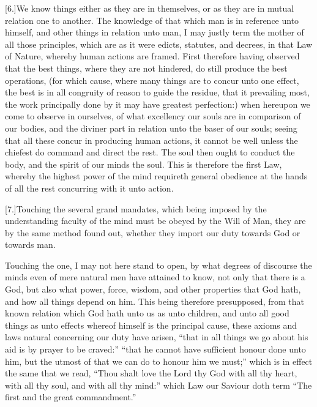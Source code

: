 [6.]We know things either as they are in themselves, or as they are in mutual relation one to another. The knowledge of that which man is in reference unto himself, and other things in relation unto man, I may justly term the mother of all those principles, which are as it were edicts, statutes, and decrees, in that Law of Nature, whereby human actions are framed. First therefore having observed that the best things, where they are not hindered, do still produce the best operations, (for which cause, where many things are to concur unto one effect, the best is in all congruity of reason to guide the residue, that it prevailing most, the work principally done by it may have greatest perfection:) when hereupon we come to observe in ourselves, of what excellency our souls are in comparison of our bodies, and the diviner part in relation unto the baser of our souls; seeing that all these concur in producing human actions, it cannot be well unless the chiefest do command and direct the rest. The soul then ought to conduct the body, and the spirit of our minds the soul. This is therefore the first Law, whereby the highest power of the mind requireth general obedience at the hands of all the rest concurring with it unto action.

[7.]Touching the several grand mandates, which being imposed by the understanding faculty of the mind must be obeyed by the Will of Man, they are by the same method found out, whether they import our duty towards God or towards man.

Touching the one, I may not here stand to open, by what degrees of discourse the minds even of mere natural men have attained to know, not only that there is a God, but also what power, force, wisdom, and other properties that God hath, and how all things depend on him. This being therefore presupposed, from that known relation which God hath  unto us as unto children, and unto all good things as unto effects whereof himself is the principal cause, these axioms and laws natural concerning our duty have arisen, “that in all things we go about his aid is by prayer to be craved:” “that he cannot have sufficient honour done unto him, but the utmost of that we can do to honour him we must;” which is in effect the same that we read, “Thou shalt love the Lord thy God with all thy heart, with all thy soul, and with all thy mind:” which Law our Saviour doth term “The first and the great commandment.”

